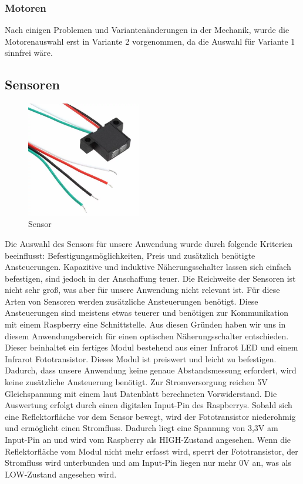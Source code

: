 \subsubsection{Motoren}
Nach einigen Problemen und Variantenänderungen in der Mechanik, wurde die Motorenauswahl erst in Variante 2 vorgenommen, da die Auswahl für Variante 1 sinnfrei wäre.

\subsection{Sensoren}
\begin{figure}[H] 
\begin{center}

\includegraphics[width=5cm]{Bilder/Bauteile/Sensor}
\caption{Sensor}
\label{Sensor}

\end{center}
\end{figure}
Die Auswahl des Sensors für unsere Anwendung wurde durch folgende Kriterien beeinflusst: Befestigungsmöglichkeiten, Preis und zusätzlich benötigte Ansteuerungen.
Kapazitive und induktive Näherungsschalter lassen sich einfach befestigen, sind jedoch in der Anschaffung teuer. Die Reichweite der Sensoren ist nicht sehr groß, was aber für unsere Anwendung nicht relevant ist. Für diese Arten von Sensoren werden zusätzliche Ansteuerungen benötigt. Diese Ansteuerungen sind meistens etwas teuerer und benötigen zur Kommunikation mit einem Raspberry eine Schnittstelle.
Aus diesen Gründen haben wir uns in diesem Anwendungsbereich für einen optischen Näherungsschalter entschieden. Dieser beinhaltet ein fertiges Modul bestehend aus einer Infrarot LED und einem Infrarot Fototransistor. Dieses Modul ist preiswert und leicht zu befestigen. \\Dadurch, dass unsere Anwendung keine genaue Abstandsmessung erfordert, wird keine zusätzliche Ansteuerung benötigt. Zur Stromversorgung reichen 5V Gleichspannung mit einem laut Datenblatt berechneten Vorwiderstand. Die Auswertung erfolgt durch einen digitalen Input-Pin des Raspberrys. Sobald sich eine Reflektorfläche vor dem Sensor bewegt, wird der Fototransistor niederohmig und ermöglicht einen Stromfluss. Dadurch liegt eine Spannung von 3,3V am Input-Pin an und wird vom Raspberry als HIGH-Zustand angesehen. Wenn die Reflektorfläche vom Modul nicht mehr erfasst wird, sperrt der Fototransistor, der Stromfluss wird unterbunden und am Input-Pin liegen nur mehr 0V an, was als LOW-Zustand angesehen wird. \\

